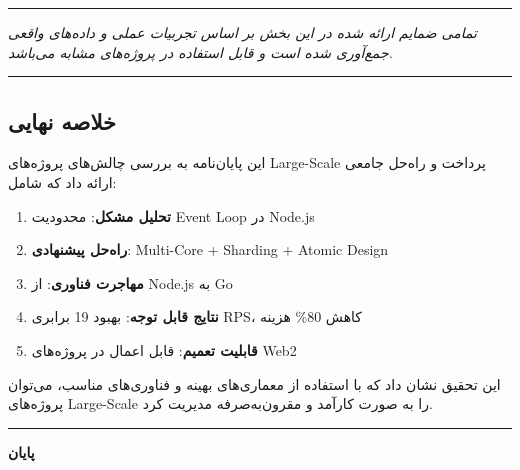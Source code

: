 \documentclass[
]{article}
\providecommand{\tightlist}{%
  \setlength{\itemsep}{0pt}\setlength{\parskip}{0pt}}
\begin{document}
\begin{center}\rule{0.5\linewidth}{0.5pt}\end{center}

\emph{تمامی ضمایم ارائه شده در این بخش بر اساس تجربیات عملی و داده‌های
واقعی جمع‌آوری شده است و قابل استفاده در پروژه‌های مشابه می‌باشد.}

\begin{center}\rule{0.5\linewidth}{0.5pt}\end{center}

\subsection{خلاصه
نهایی}\label{ux62eux644ux627ux635ux647-ux646ux647ux627ux6ccux6cc}

این پایان‌نامه به بررسی چالش‌های پروژه‌های Large-Scale پرداخت و راه‌حل جامعی
ارائه داد که شامل:

\begin{enumerate}
\def\labelenumi{\arabic{enumi}.}
\tightlist
\item
  \textbf{تحلیل مشکل}: محدودیت Event Loop در Node.js
\item
  \textbf{راه‌حل پیشنهادی}: Multi-Core + Sharding + Atomic Design
\item
  \textbf{مهاجرت فناوری}: از Node.js به Go
\item
  \textbf{نتایج قابل توجه}: بهبود 19 برابری RPS، کاهش 80\% هزینه
\item
  \textbf{قابلیت تعمیم}: قابل اعمال در پروژه‌های Web2
\end{enumerate}

این تحقیق نشان داد که با استفاده از معماری‌های بهینه و فناوری‌های مناسب،
می‌توان پروژه‌های Large-Scale را به صورت کارآمد و مقرون‌به‌صرفه مدیریت کرد.

\begin{center}\rule{0.5\linewidth}{0.5pt}\end{center}

\textbf{پایان}
\end{document}
